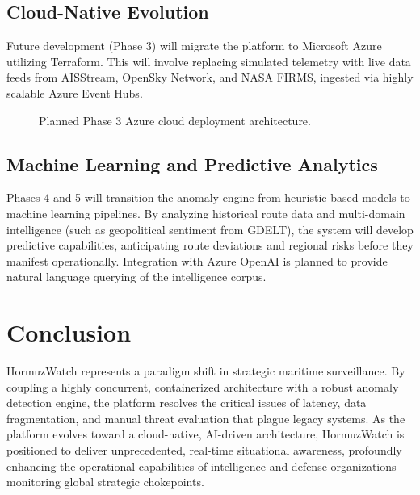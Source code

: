 \documentclass[11pt,a4paper]{article}
\begin{document}
\subsection{Cloud-Native Evolution}
Future development (Phase 3) will migrate the platform to Microsoft Azure utilizing Terraform. This will involve replacing simulated telemetry with live data feeds from AISStream, OpenSky Network, and NASA FIRMS, ingested via highly scalable Azure Event Hubs.

\begin{figure}[h]
    \centering
    \caption{Planned Phase 3 Azure cloud deployment architecture.}
    \label{fig:cloud}
\end{figure}

\subsection{Machine Learning and Predictive Analytics}
Phases 4 and 5 will transition the anomaly engine from heuristic-based models to machine learning pipelines. By analyzing historical route data and multi-domain intelligence (such as geopolitical sentiment from GDELT), the system will develop predictive capabilities, anticipating route deviations and regional risks before they manifest operationally. Integration with Azure OpenAI is planned to provide natural language querying of the intelligence corpus.

\section{Conclusion}
HormuzWatch represents a paradigm shift in strategic maritime surveillance. By coupling a highly concurrent, containerized architecture with a robust anomaly detection engine, the platform resolves the critical issues of latency, data fragmentation, and manual threat evaluation that plague legacy systems. As the platform evolves toward a cloud-native, AI-driven architecture, HormuzWatch is positioned to deliver unprecedented, real-time situational awareness, profoundly enhancing the operational capabilities of intelligence and defense organizations monitoring global strategic chokepoints.
\end{document}
